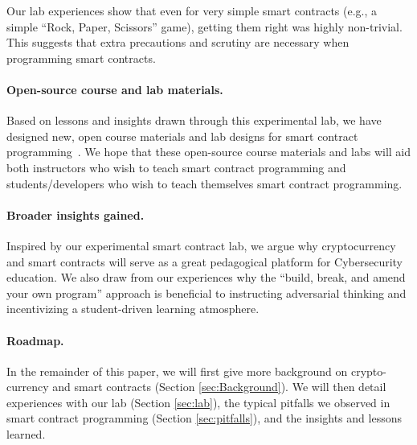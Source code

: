 \documentclass[10pt,twocolumn,letterpaper]{article}
\newcommand{\elaine}[1]{}
\begin{document}
Our lab experiences show that even for 
very simple smart contracts (e.g., a simple 
``Rock, Paper, Scissors'' game), 
getting them right 
was highly non-trivial.
This suggests that extra precautions 
and scrutiny 
are necessary when programming smart contracts.





\paragraph{Open-source course and lab materials.}
Based on lessons and insights 
drawn through this experimental lab, we have designed
new, open course materials and lab designs 
for smart contract programming~\cite{anonymous}.
We hope that these open-source course materials and labs
will aid both instructors who 
wish to teach smart contract programming and students/developers who 
wish to teach themselves smart contract programming.
\elaine{probably the langugage can be better.}

\paragraph{Broader insights gained.}
Inspired by our experimental 
smart contract lab, 
we argue why cryptocurrency and smart contracts 
will serve as a great pedagogical platform 
for Cybersecurity education.
We also draw from our experiences
why the ``build, break, and amend your own program'' 
approach is beneficial to instructing adversarial thinking
and incentivizing a student-driven learning 
atmosphere.

\paragraph{Roadmap.}
In the remainder of this paper, we will first give more background on 
crypto-currency and smart contracts (Section \ref{sec:Background}). 
We will then detail experiences with our lab (Section \ref{sec:lab}),  
the typical pitfalls we observed in smart  
contract programming (Section \ref{sec:pitfalls}), 
and the insights and lessons learned. 
\end{document}
